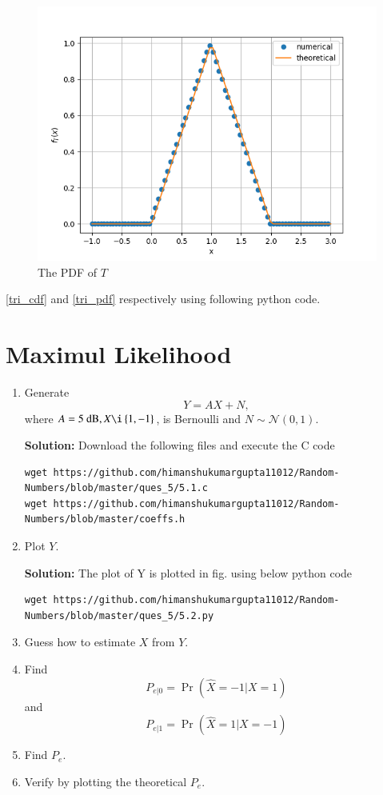 \documentclass[journal,12pt,twocolumn]{IEEEtran}
\renewcommand\thesection{\arabic{section}}
\providecommand{\pr}[1]{\ensuremath{\Pr\left(#1\right)}}
\providecommand{\cbrak}[1]{\ensuremath{\left\{#1\right\}}}
\theoremstyle{remark}
\providecommand{\gauss}[2]{\mathcal{N}\ensuremath{\left(#1,#2\right)}}
\newcommand{\solution}{\noindent \textbf{Solution: }}
\numberwithin{equation}{section}
\begin{document}
\begin{enumerate}[label=\thesection.\arabic*
,ref=\thesection.\theenumi]
\begin{figure}
	\centering
		\includegraphics[width=\columnwidth]{./ques_4/tri_pdf.png}
	\caption{The PDF of $T$}
	\label{tri_pdf}
\end{figure}
\eqref{tri_cdf} and \eqref{tri_pdf} respectively using following python code.
\end{enumerate}
\section{Maximul Likelihood}
\begin{enumerate}[label=\thesection.\arabic*
,ref=\thesection.\theenumi]
\item Generate 
\begin{equation}
Y = AX+N,
\end{equation}
		where $A = 5 \text{ dB}, X \i \cbrak{1,-1}$,  is Bernoulli and $N \sim \gauss{0}{1}$.
		
	\solution Download the following files and execute the C code
	\begin{lstlisting}
wget https://github.com/himanshukumargupta11012/Random-Numbers/blob/master/ques_5/5.1.c
wget https://github.com/himanshukumargupta11012/Random-Numbers/blob/master/coeffs.h
	\end{lstlisting}
	\item Plot $Y$.
	
	\solution
	The plot of Y is plotted in fig. using below python code
	\begin{lstlisting}
wget https://github.com/himanshukumargupta11012/Random-Numbers/blob/master/ques_5/5.2.py
	\end{lstlisting} 
	\item Guess how to estimate $X$ from $Y$.
\item
\label{ml-ch4_sim}
Find 
\begin{equation}
	P_{e|0} = \pr{\hat{X} = -1|X=1}
\end{equation}
and 
\begin{equation}
	P_{e|1} = \pr{\hat{X} = 1|X=-1}
\end{equation}
%
\item Find $P_e$.
%
\item
Verify by plotting  the theoretical $P_e$.  
		\end{enumerate}
\end{document}
